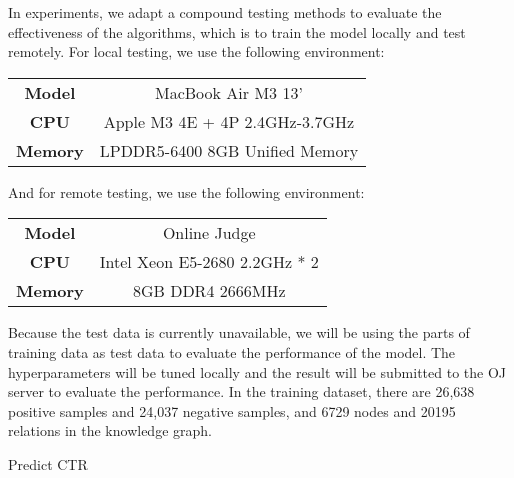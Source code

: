 \documentclass{article}
\begin{document}
In experiments, we adapt a compound testing methods to evaluate the effectiveness of the algorithms, which is to train the model locally and test remotely. For local testing, we use the following environment:
\begin{table}[!htbp]
    \begin{center}
    \begin{tabular}[c]{cc}
        \textbf{Model} & MacBook Air M3 13' \\
        \textbf{CPU} & Apple M3 4E + 4P 2.4GHz-3.7GHz \\
        \textbf{Memory} & LPDDR5-6400 8GB Unified Memory
    \end{tabular}
    \end{center}
\end{table}

And for remote testing, we use the following environment:

\begin{table}[!htbp]
    \begin{center}
    \begin{tabular}[c]{cc}
        \textbf{Model} & Online Judge \\
        \textbf{CPU} & Intel Xeon E5-2680 2.2GHz * 2 \\
        \textbf{Memory} & 8GB DDR4 2666MHz
    \end{tabular}
    \end{center}
\end{table}

Because the test data is currently unavailable, we will be using the parts of training data as test data to evaluate the performance of the model. The hyperparameters will be tuned locally and the result will be submitted to the OJ server to evaluate the performance. In the training dataset, there are
26,638 positive samples and 24,037 negative samples, and 6729 nodes and 20195 relations in the knowledge graph.

\begin{algorithm}[!ht]
\caption{Predict CTR}
\end{algorithm}
\end{document}
